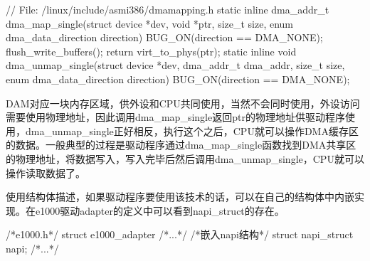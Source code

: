 \documentclass[fontsize=11pt, %
                             paper=a4, %
                             oneside, %
                             captions=tableheading,
                             index=totoc,
                             hyperref]{labbook}
\begin{document}
\begin{addmargin}[0cm]{0cm}
\begin{pyglist}
// File: /linux/include/asm­i386/dma­mapping.h
static inline dma_addr_t
dma_map_single(struct device *dev, void *ptr, size_t size,
               enum dma_data_direction direction)
{
  BUG_ON(direction == DMA_NONE);
  flush_write_buffers();
  return virt_to_phys(ptr);
}
static inline void
dma_unmap_single(struct device *dev, dma_addr_t dma_addr,
               size_t size, enum dma_data_direction direction)
{
  BUG_ON(direction == DMA_NONE);
}
\end{pyglist}

\indent DAM对应一块内存区域，供外设和CPU共同使用，当然不会同时使用，外设访问需要使用物理地址，因此调用dma\_map\_single返回ptr的物理地址供驱动程序使用，dma\_unmap\_single正好相反，执行这个之后，CPU就可以操作DMA缓存区的数据。一般典型的过程是驱动程序通过dma\_map\_single函数找到DMA共享区的物理地址，将数据写入，写入完毕后然后调用dma\_unmap\_single，CPU就可以操作读取数据了。


\indent {}使用结构体描述，如果驱动程序要使用该技术的话，可以在自己的结构体中内嵌实现。在e1000驱动adapter的定义中可以看到napi\_struct的存在。\\
\begin{pyglist}[language=c,caption={e1000.h},listingname=\textbf{Program},
	listingnamefont=\sffamily\bfseries\color{yellow},%
        captionfont=\sffamily\color{white},captionbgcolor=gray,
        fvset={frame=bottomline,framerule=4pt,rulecolor=\color{gray}}
        ]
/*e1000.h*/
struct e1000_adapter {
  /*...*/
  /*嵌入napi结构*/
  struct napi_struct napi;
  /*...*/
}
\end{pyglist}



\end{addmargin}
\end{document}

